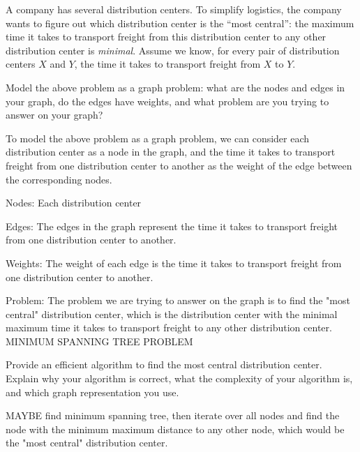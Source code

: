 \begin{problem}
A company has several distribution centers. To simplify logistics, the company wants to figure out which distribution center is the ``most central'': the maximum time it takes to transport freight from this distribution center to any other distribution center is \emph{minimal}. Assume we know, for every pair of distribution centers $X$ and $Y$, the time it takes to transport freight from $X$ to $Y$.
\begin{questions}
\item Model the above problem as a graph problem: what are the nodes and edges in your graph, do the edges have weights, and what problem are you trying to answer on your graph?

To model the above problem as a graph problem, we can consider each distribution center as a node in the graph, and the time it takes to transport freight from one distribution center to another as the weight of the edge between the corresponding nodes.

Nodes: Each distribution center

Edges: The edges in the graph represent the time it takes to transport freight from one distribution center to another.

Weights: The weight of each edge is the time it takes to transport freight from one distribution center to another.

Problem: The problem we are trying to answer on the graph is to find the "most central" distribution center, which is the distribution center with the minimal maximum time it takes to transport freight to any other distribution center.
MINIMUM SPANNING TREE PROBLEM

\item Provide an efficient algorithm to find the most central distribution center. Explain why your algorithm is correct, what the complexity of your algorithm is, and which graph representation you use.

MAYBE find minimum spanning tree, then iterate over all nodes and find the node with the minimum maximum distance to any other node, which would be the "most central" distribution center.


\end{questions}
\end{problem}

